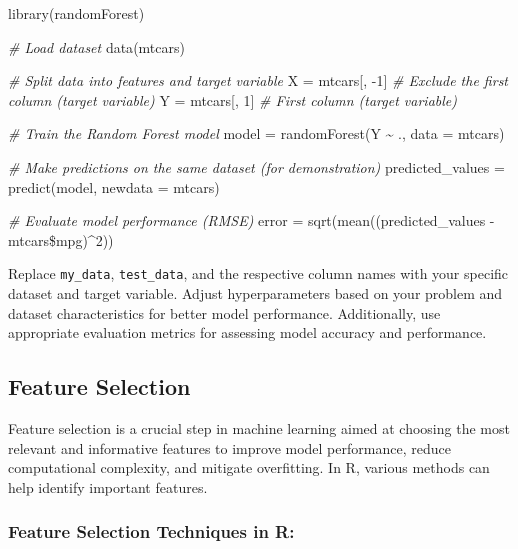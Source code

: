 \documentclass[
]{article}
\newenvironment{Shaded}{}{}
\newcommand{\AttributeTok}[1]{\textcolor[rgb]{0.49,0.56,0.16}{#1}}
\newcommand{\CommentTok}[1]{\textcolor[rgb]{0.38,0.63,0.69}{\textit{#1}}}
\newcommand{\DecValTok}[1]{\textcolor[rgb]{0.25,0.63,0.44}{#1}}
\newcommand{\FunctionTok}[1]{\textcolor[rgb]{0.02,0.16,0.49}{#1}}
\newcommand{\NormalTok}[1]{#1}
\newcommand{\OtherTok}[1]{\textcolor[rgb]{0.00,0.44,0.13}{#1}}
\newcommand{\SpecialCharTok}[1]{\textcolor[rgb]{0.25,0.44,0.63}{#1}}
\begin{document}
\begin{Shaded}
\begin{Highlighting}[]
\FunctionTok{library}\NormalTok{(randomForest)}

\CommentTok{\# Load dataset}
\FunctionTok{data}\NormalTok{(mtcars)}

\CommentTok{\# Split data into features and target variable}
\NormalTok{X }\OtherTok{=}\NormalTok{ mtcars[, }\SpecialCharTok{{-}}\DecValTok{1}\NormalTok{]  }\CommentTok{\# Exclude the first column (target variable)}
\NormalTok{Y }\OtherTok{=}\NormalTok{ mtcars[, }\DecValTok{1}\NormalTok{]   }\CommentTok{\# First column (target variable)}

\CommentTok{\# Train the Random Forest model}
\NormalTok{model }\OtherTok{=} \FunctionTok{randomForest}\NormalTok{(Y }\SpecialCharTok{\textasciitilde{}}\NormalTok{ ., }\AttributeTok{data =}\NormalTok{ mtcars)}

\CommentTok{\# Make predictions on the same dataset (for demonstration)}
\NormalTok{predicted\_values }\OtherTok{=} \FunctionTok{predict}\NormalTok{(model, }\AttributeTok{newdata =}\NormalTok{ mtcars)}

\CommentTok{\# Evaluate model performance (RMSE)}
\NormalTok{error }\OtherTok{=} \FunctionTok{sqrt}\NormalTok{(}\FunctionTok{mean}\NormalTok{((predicted\_values }\SpecialCharTok{{-}}\NormalTok{ mtcars}\SpecialCharTok{\$}\NormalTok{mpg)}\SpecialCharTok{\^{}}\DecValTok{2}\NormalTok{))}
\end{Highlighting}
\end{Shaded}

Replace \texttt{my\_data}, \texttt{test\_data}, and the respective
column names with your specific dataset and target variable. Adjust
hyperparameters based on your problem and dataset characteristics for
better model performance. Additionally, use appropriate evaluation
metrics for assessing model accuracy and performance.

\hypertarget{feature-selection}{%
\subsection{Feature Selection}\label{feature-selection}}

Feature selection is a crucial step in machine learning aimed at
choosing the most relevant and informative features to improve model
performance, reduce computational complexity, and mitigate overfitting.
In R, various methods can help identify important features.

\hypertarget{feature-selection-techniques-in-r}{%
\subsubsection{Feature Selection Techniques in
R:}\label{feature-selection-techniques-in-r}}
\end{document}
